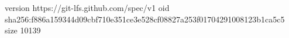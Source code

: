 version https://git-lfs.github.com/spec/v1
oid sha256:f886a159344d09cbf710e351ce3e528cf08827a253f01704291008123b1ca5c5
size 10139
